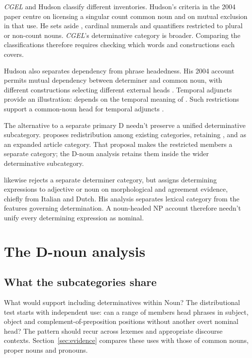 \documentclass[12pt]{article}
\begin{document}
\textit{CGEL} and Hudson classify different inventories. Hudson's criteria in the 2004 paper centre on licensing a singular count common noun and on mutual exclusion in that use. He sets aside , cardinal numerals and quantifiers restricted to plural or non-count nouns. \textit{CGEL}'s determinative category is broader. Comparing the classifications therefore requires checking which words and constructions each covers.

Hudson also separates dependency from phrase headedness. His 2004 account permits mutual dependency between determiner and common noun, with different constructions selecting different external heads \citep[7--9]{hudson2004determiners}. Temporal adjuncts provide an illustration:  depends on the temporal meaning of . Such restrictions support a common-noun head for temporal adjuncts \citep[10--12]{hudson2004determiners}.

The alternative to a separate primary D needn't preserve a unified determinative subcategory. \textcite{spinillo2004reconceptualising} proposes redistribution among existing categories, retaining ,  and  as an expanded article category. That proposal makes the restricted members a separate category; the D-noun analysis retains them inside the wider determinative subcategory.

\textcite{vaneynde2003determiner} likewise rejects a separate determiner category, but assigns determining expressions to adjective or noun on morphological and agreement evidence, chiefly from Italian and Dutch. His analysis separates lexical category from the features governing determination. A noun-headed NP account therefore needn't unify every determining expression as nominal.


\section{The D-noun analysis}\label{sec:proposal}

\subsection{What the subcategories share}

What would support including determinatives within Noun? The distributional test starts with independent use: can a range of members head phrases in subject, object and complement-of-preposition positions without another overt nominal head? The pattern should recur across lexemes and appropriate discourse contexts. Section~\ref{sec:evidence} compares these uses with those of common nouns, proper nouns and pronouns.
\end{document}
